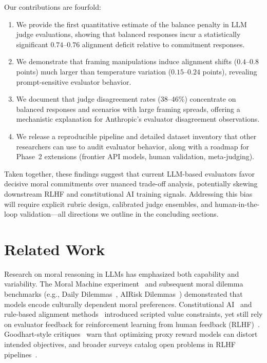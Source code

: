 \documentclass[11pt]{article}
\begin{document}
Our contributions are fourfold:
\begin{enumerate}
    \item We provide the first quantitative estimate of the balance penalty in LLM judge evaluations, showing that balanced responses incur a statistically significant $0.74$--$0.76$ alignment deficit relative to commitment responses.
    \item We demonstrate that framing manipulations induce alignment shifts ($0.4$--$0.8$ points) much larger than temperature variation ($0.15$--$0.24$ points), revealing prompt-sensitive evaluator behavior.
    \item We document that judge disagreement rates (38--46\%) concentrate on balanced responses and scenarios with large framing spreads, offering a mechanistic explanation for Anthropic's evaluator disagreement observations.
    \item We release a reproducible pipeline and detailed dataset inventory that other researchers can use to audit evaluator behavior, along with a roadmap for Phase~2 extensions (frontier API models, human validation, meta-judging).
\end{enumerate}

Taken together, these findings suggest that current LLM-based evaluators favor decisive moral commitments over nuanced trade-off analysis, potentially skewing downstream RLHF and constitutional AI training signals. Addressing this bias will require explicit rubric design, calibrated judge ensembles, and human-in-the-loop validation---all directions we outline in the concluding sections.

\section{Related Work}
\label{sec:related}

Research on moral reasoning in LLMs has emphasized both capability and variability. The Moral Machine experiment~\citep{awad2018moral} and subsequent moral dilemma benchmarks (e.g., Daily Dilemmas~\citep{chiu2024daily}, AIRisk Dilemmas~\citep{chiu2025airisk}) demonstrated that models encode culturally dependent moral preferences. Constitutional AI~\citep{bai2022constitutional} and rule-based alignment methods~\citep{mu2024rule} introduced scripted value constraints, yet still rely on evaluator feedback for reinforcement learning from human feedback (RLHF)~\citep{christiano2017deep}. Goodhart-style critiques~\citep{manheim2018categorizing} warn that optimizing proxy reward models can distort intended objectives, and broader surveys catalog open problems in RLHF pipelines~\citep{casper2023limitations}.
\end{document}
